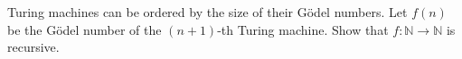 Turing machines can be ordered by the size of their Gödel numbers. Let $f(n)$ be the Gödel number of the $(n + 1)$-th Turing machine. Show that $f: \mathbb{N} \to \mathbb{N}$ is recursive.
